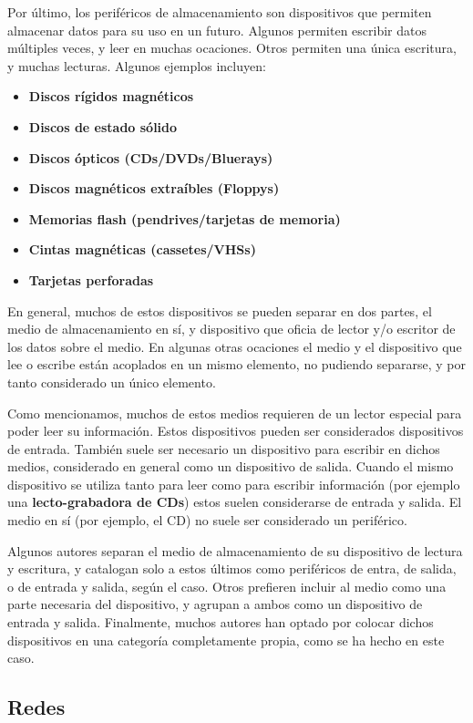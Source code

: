 Por último, los periféricos de almacenamiento son dispositivos que permiten
almacenar datos para su uso en un futuro. Algunos permiten escribir datos
múltiples veces, y leer en muchas ocaciones. Otros permiten una única escritura,
y muchas lecturas. Algunos ejemplos incluyen:
\begin{itemize}
    \item \textbf{Discos rígidos magnéticos}
    \item \textbf{Discos de estado sólido}
    \item \textbf{Discos ópticos (CDs/DVDs/Bluerays)}
    \item \textbf{Discos magnéticos extraíbles (Floppys)}
    \item \textbf{Memorias flash (pendrives/tarjetas de memoria)}
    \item \textbf{Cintas magnéticas (cassetes/VHSs)}
    \item \textbf{Tarjetas perforadas}
\end{itemize}

En general, muchos de estos dispositivos se pueden separar en dos partes, el
medio de almacenamiento en sí, y dispositivo que oficia de lector y/o escritor
de los datos sobre el medio. En algunas otras ocaciones el medio y el dispositivo
que lee o escribe están acoplados en un mismo elemento, no pudiendo separarse,
y por tanto considerado un único elemento.

Como mencionamos, muchos de estos medios requieren de un lector especial para poder
leer su información. Estos dispositivos pueden ser considerados dispositivos de
entrada. También suele ser necesario un dispositivo para escribir en dichos
medios, considerado en general como un dispositivo de salida. Cuando el mismo
dispositivo se utiliza tanto para leer como para escribir información (por
ejemplo una \textbf{lecto-grabadora de CDs}) estos suelen considerarse de
entrada y salida. El medio en sí (por ejemplo, el CD) no suele ser considerado
un periférico.

Algunos autores separan el medio de almacenamiento de su dispositivo de lectura
y escritura, y catalogan solo a estos últimos como periféricos de entra, de
salida, o de entrada y salida, según el caso. Otros prefieren incluir al medio
como una parte necesaria del dispositivo, y agrupan a ambos como un dispositivo
de entrada y salida. Finalmente, muchos autores han optado por colocar dichos
dispositivos en una categoría completamente propia, como se ha hecho en este
caso.

\subsection{Redes}

